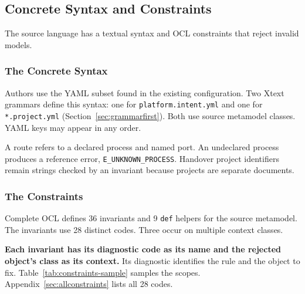 \subsection{Concrete Syntax and Constraints}
\label{sec:constraints}

The source language has a textual syntax and OCL constraints that reject
invalid models.

\subsubsection{The Concrete Syntax}

Authors use the YAML subset found in the existing configuration. Two Xtext
grammars define this syntax: one for \texttt{platform.intent.yml} and one for
\texttt{*.project.yml} (Section~\ref{sec:grammarfirst}). Both use source
metamodel classes. YAML keys may appear in any order.

A route refers to a declared process and named port. An undeclared process
produces a reference error, \texttt{E\_UNKNOWN\_PROCESS}. Handover project
identifiers remain strings checked by an invariant because projects are
separate documents.

\subsubsection{The Constraints}

Complete OCL defines 36 invariants and 9 \texttt{def} helpers for the source
metamodel. The invariants use 28 distinct codes. Three occur on multiple
context classes.

\textbf{Each invariant has its diagnostic code as its name and the rejected
object's class as its context.} Its diagnostic identifies the rule and the
object to fix. Table~\ref{tab:constraints-sample} samples the scopes.
Appendix~\ref{sec:allconstraints} lists all 28 codes.

